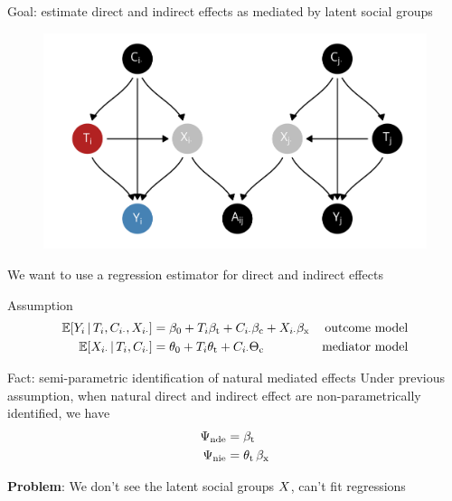 \documentclass[aspectratio=169]{beamer}
\theoremstyle{remark}
\begin{document}
\begin{frame}{Goal: estimate direct and indirect effects as mediated by latent social groups}
    \begin{figure}
        \centering
        \includegraphics[width=\textwidth]{./figures/dags/homophily-mediating.png}
    \end{figure}
\end{frame}

\begin{frame}{We want to use a regression estimator for direct and indirect effects}
    \begin{block}{Assumption}
        \begin{equation*}
            \begin{aligned}
                \E[T_i, \C_{i \cdot}, \X_{i \cdot}]{Y_i}
                 & = \betazero + T_i \betat + \C_{i \cdot} \betac + \X_{i \cdot} \betax
                 & \text{outcome model}                                                 \\
                \E[T_i, \C_{i \cdot}]{\X_{i \cdot}}
                 & = \thetazero + T_i \thetat + \C_{i \cdot} \Thetac
                 & \text{mediator model}
            \end{aligned}
        \end{equation*}
    \end{block}
    \begin{block}{Fact: semi-parametric identification of natural mediated effects}
        Under previous assumption, when natural direct and indirect effect are non-parametrically identified, we have
        \begin{equation*}
            \begin{aligned}
                \Psi_\mathrm{nde} & = \beta_\text{t}            \\
                \Psi_\mathrm{nie} & = \theta_\text{t} \, \beta_\text{x}
            \end{aligned}
        \end{equation*}
    \end{block}
    \centering
    \textbf{Problem}: We don't see the latent social groups $X$, can't fit regressions
\end{frame}
\end{document}
